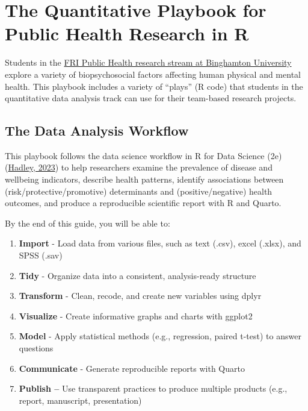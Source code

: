 \documentclass[
  english,
  letterpaper,
  DIV=11,
  numbers=noendperiod]{scrreprt}
\providecommand{\tightlist}{%
  \setlength{\itemsep}{0pt}\setlength{\parskip}{0pt}}
\begin{document}
\chapter{The Quantitative Playbook for Public Health Research in
R}\label{the-quantitative-playbook-for-public-health-research-in-r}

Students in the \href{https://fripublichealth.quarto.pub}{FRI Public
Health research stream at Binghamton University} explore a variety of
biopsychosocial factors affecting human physical and mental health. This
playbook includes a variety of ``plays'' (R code) that students in the
quantitative data analysis track can use for their team-based research
projects.

\section{The Data Analysis Workflow}\label{the-data-analysis-workflow}

This playbook follows the data science workflow in R for Data Science
(2e) (\href{https://r4ds.hadley.nz/whole-game.html}{Hadley, 2023}) to
help researchers examine the prevalence of disease and wellbeing
indicators, describe health patterns, identify associations between
(risk/protective/promotive) determinants and (positive/negative) health
outcomes, and produce a reproducible scientific report with R and
Quarto.

By the end of this guide, you will be able to:

\begin{enumerate}
\def\labelenumi{\arabic{enumi}.}
\tightlist
\item
  \textbf{Import} - Load data from various files, such as text (.csv),
  excel (.xlsx), and SPSS (.sav)
\item
  \textbf{Tidy} - Organize data into a consistent, analysis-ready
  structure
\item
  \textbf{Transform} - Clean, recode, and create new variables using
  dplyr
\item
  \textbf{Visualize} - Create informative graphs and charts with ggplot2
\item
  \textbf{Model} - Apply statistical methods (e.g., regression, paired
  t-test) to answer questions
\item
  \textbf{Communicate} - Generate reproducible reports with Quarto
\item
  \textbf{Publish --} Use transparent practices to produce multiple
  products (e.g., report, manuscript, presentation)
\end{enumerate}
\end{document}
